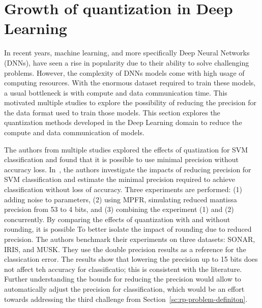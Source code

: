 

\section{Growth of quantization in Deep Learning}
\begin{comment}
- Specify what makes DL a good candidate for RP.
- Describe the different examples in DL. methods, accuracy/performance tradeoff.
- Mention what explain the success of RP in DL and transition to other fields.
- Mention the adoption of RP in other domains.
\end{comment}
In recent years, machine learning, and more specifically Deep Neural Networks (DNNs),
have seen a rise in popularity due to their ability to solve challenging problems.
However, the complexity of DNNs models come with high usage of computing resources.
With the enormous dataset required to train these models, a usual bottleneck is with compute and data communication time.
This motivated multiple studies \cite{Johnson2018-up,Wang2018-oo,Lesser2011-mn,Chen2018-an,Judd2015-kw,Vicuna2021-mw}
to explore the possibility of reducing the precision for the data format used to train those models.
This section explores the quantization methods developed in the Deep Learning 
domain to reduce the compute and data communication of models.

The authors from multiple studies explored the effects of quatization for SVM classification
and found that it is possible to use minimal precision without accuracy loss.
In~\cite{Lesser2011-mn}, the authors investigate the impacts of reducing precision for SVM
classification and estimate the minimal precision required to achieve classification 
without loss of accuracy. Three experiments are performed: 
(1) adding noise to parameters,
(2) using MPFR, simulating reduced mantissa precision from 53 to 4 bits,
and (3) combining the experiment (1) and (2) concurrently.
By comparing the effects of quantization with and without rounding, it is possible To
better isolate the impact of rounding due to reduced precision.
The authors benchmark their experiments on three datasets: SONAR, IRIS, and MUSK.
They use the double precision results as a reference for the classication error.
The results show that lowering the precision up to 15 bits does not affect teh accuracy
for classificatio; this is consistent with the literature.
Further understanding the bounds for reducing the precision would allow to automatically
adjust the precision for classification, which would be an effort towards addressing the third 
challenge from Section~\ref{sc:rp-problem-definiton}.

